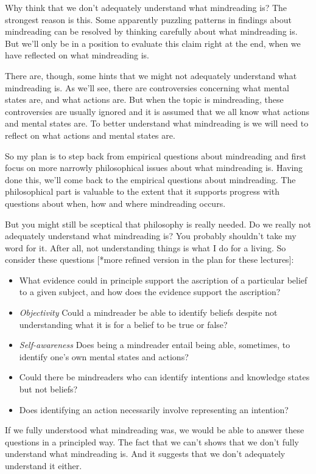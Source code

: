 \documentclass[12pt,\papersize]{extarticle}
\begin{document}
Why think that we don't adequately understand what mindreading is? 
The strongest reason is this.
Some apparently puzzling patterns in findings about mindreading can be resolved by thinking carefully about what mindreading is. 
But we'll only be in a position to evaluate this claim right at the end, when we have reflected on what mindreading is.

There are, though, some hints that we might not adequately understand what mindreading is.
As we'll see, there are controversies concerning what mental states are, and what actions are.  
But when the topic is mindreading, these controversies are usually ignored and it is assumed that we all know what actions and mental states are. 
To better understand what mindreading is we will need to reflect on what actions and mental states are.

So my plan is to step back from empirical questions about mindreading and first focus on more narrowly philosophical issues about what mindreading is.
Having done this, we'll come back to the empirical questions about mindreading.  
The philosophical part is valuable to the extent that it supports progress with questions about when, how and where mindreading occurs.

But you might still be sceptical that philosophy is really needed.  Do we really not adequately understand what mindreading is?
You probably shouldn't take my word for it.
After all, not understanding things is what I do for a living.
So consider these questions 
[*more refined version in the plan for these lectures]:
\begin{itemize}
%
\item What evidence could in principle support the ascription of a particular belief to a given subject, and how does the evidence support the ascription?
%
\item \emph{Objectivity} Could a mindreader be able to identify beliefs despite not  understanding what it is for a belief to be true or false? 
%
\item \emph{Self-awareness}  Does being a mindreader entail being able, sometimes, to identify one's own mental states and actions? 
%
\item Could there be mindreaders who can identify intentions and knowledge states but not beliefs?
%
\item Does identifying an action necessarily involve representing an intention?
%
\end{itemize}
If we fully understood what mindreading was, we would be able to answer these questions in a principled way.
The fact that we can't shows that we don't fully understand what mindreading is.
And it suggests that we don't adequately understand it either.
\end{document}
